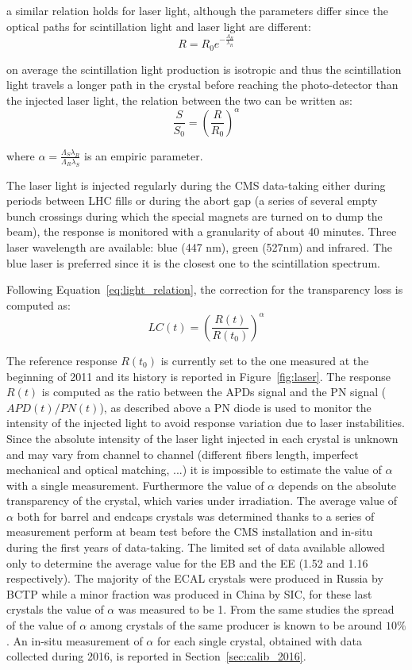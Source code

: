 a similar relation holds for laser light, although the parameters differ since the optical paths for scintillation
light and laser light are different:
\[
  R = R_0 e^{-\frac{\Lambda_R}{\lambda_R}}
\]

on average the scintillation light production is isotropic and thus
the scintillation light travels a longer path in the crystal before reaching the photo-detector than the
injected laser light, the relation between the two can be written as:
\begin{equation}
  \frac{S}{S_0} = \left(\frac{R}{R_0}\right)^{\alpha}
\end{equation}
\label{eq:light_relation}

where $\alpha = \frac{\Lambda_S \lambda_R}{\Lambda_R \lambda_S}$ is an empiric parameter.

The laser light is injected regularly during the CMS data-taking either during periods between LHC fills or
during the abort gap (a series of several empty bunch crossings during which the special magnets 
are turned on to dump the beam), the response is monitored with a granularity of about 40 minutes.
Three laser wavelength are available: blue (447 nm), green (527nm) and infrared. The blue laser is
preferred since it is the closest one to the scintillation spectrum.

Following Equation~\ref{eq:light_relation}, the correction for the transparency loss is computed as:
\[
  LC(t) = \left(\frac{R(t)}{R(t_0)}\right)^{\alpha}
\]

The reference response $R(t_0)$  is currently set to the one measured at the beginning of 2011 and its history is
reported in Figure~\ref{fig:laser}.
The response $R(t)$ is computed as the ratio between the APDs signal and the PN signal ($APD(t)/PN(t)$), as described above
a PN diode is used to monitor the intensity of the injected light to avoid response variation due to laser instabilities.
Since the absolute intensity of the laser light injected in each crystal is unknown and may vary from channel to channel
(different fibers length, imperfect mechanical and optical matching, ...) it is impossible to estimate the value of $\alpha$
with a single measurement. Furthermore the value of $\alpha$ depends on the absolute transparency of the crystal, which
varies under irradiation.
The average value of $\alpha$ both for barrel and endcaps crystals was determined thanks to a series of measurement perform
at beam test before the CMS installation and in-situ during the first years of data-taking. The limited set of data available
allowed only to determine the average value for the EB and the EE (1.52 and 1.16 respectively).
The majority of the ECAL crystals were produced in
Russia by BCTP while a minor fraction was produced in China by SIC, for these last crystals the value of $\alpha$ was
measured to be 1. From the same studies the spread of the value of $\alpha$ among crystals of the same producer
is known to be around $10\%$. 
An in-situ measurement of $\alpha$ for each single crystal, obtained with data collected during 2016,
is reported in Section~\ref{sec:calib_2016}.

